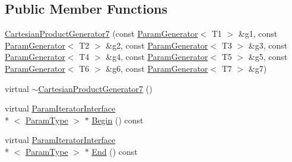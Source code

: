 \subsection*{Public Member Functions}
\begin{DoxyCompactItemize}
\item 
\hyperlink{classtesting_1_1internal_1_1CartesianProductGenerator7_aafc9c559223d3a685028ec98aa727818}{Cartesian\-Product\-Generator7} (const \hyperlink{classtesting_1_1internal_1_1ParamGenerator}{Param\-Generator}$<$ T1 $>$ \&g1, const \hyperlink{classtesting_1_1internal_1_1ParamGenerator}{Param\-Generator}$<$ T2 $>$ \&g2, const \hyperlink{classtesting_1_1internal_1_1ParamGenerator}{Param\-Generator}$<$ T3 $>$ \&g3, const \hyperlink{classtesting_1_1internal_1_1ParamGenerator}{Param\-Generator}$<$ T4 $>$ \&g4, const \hyperlink{classtesting_1_1internal_1_1ParamGenerator}{Param\-Generator}$<$ T5 $>$ \&g5, const \hyperlink{classtesting_1_1internal_1_1ParamGenerator}{Param\-Generator}$<$ T6 $>$ \&g6, const \hyperlink{classtesting_1_1internal_1_1ParamGenerator}{Param\-Generator}$<$ T7 $>$ \&g7)
\item 
virtual \hyperlink{classtesting_1_1internal_1_1CartesianProductGenerator7_a1efbaf80c9394e0626da229beb6b1084}{$\sim$\-Cartesian\-Product\-Generator7} ()
\item 
virtual \hyperlink{classtesting_1_1internal_1_1ParamIteratorInterface}{Param\-Iterator\-Interface}\\*
$<$ \hyperlink{classtesting_1_1internal_1_1CartesianProductGenerator7_ac749b651dcf74699c59f548cd33e40c1}{Param\-Type} $>$ $\ast$ \hyperlink{classtesting_1_1internal_1_1CartesianProductGenerator7_a91166095533bc7aa2fb5cc198b3c831e}{Begin} () const 
\item 
virtual \hyperlink{classtesting_1_1internal_1_1ParamIteratorInterface}{Param\-Iterator\-Interface}\\*
$<$ \hyperlink{classtesting_1_1internal_1_1CartesianProductGenerator7_ac749b651dcf74699c59f548cd33e40c1}{Param\-Type} $>$ $\ast$ \hyperlink{classtesting_1_1internal_1_1CartesianProductGenerator7_a3b5e8c49981d86e7691bf267b687a47a}{End} () const 
\end{DoxyCompactItemize}


